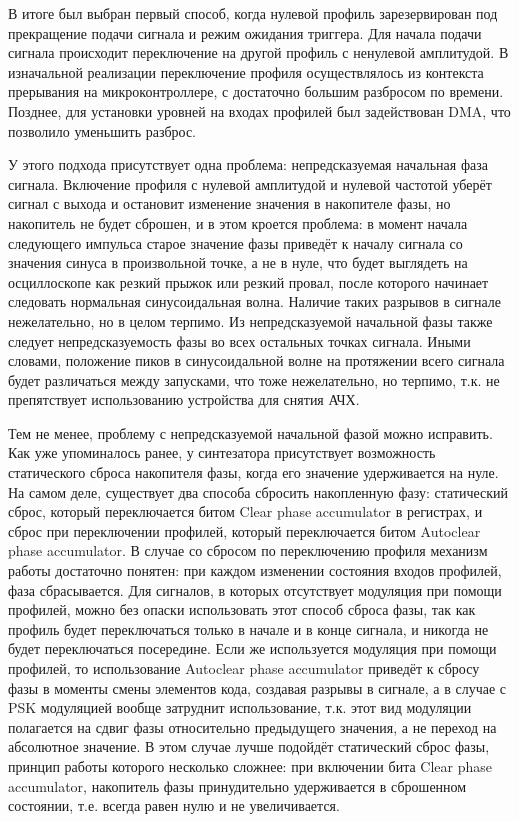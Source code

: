 \documentclass[rusmathsym, eqnumwithinsec, amspack, hyperref]{bomgost}
\begin{document}
В итоге был выбран первый способ, когда нулевой профиль зарезервирован под прекращение подачи сигнала и режим ожидания триггера. Для начала подачи сигнала происходит переключение на другой профиль с ненулевой амплитудой. В изначальной реализации переключение профиля осуществлялось из контекста прерывания на микроконтроллере, с достаточно большим разбросом по времени. Позднее, для установки уровней на входах профилей был задействован DMA, что позволило уменьшить разброс.

У этого подхода присутствует одна проблема: непредсказуемая начальная фаза сигнала. Включение профиля с нулевой амплитудой и нулевой частотой уберёт сигнал с выхода и остановит изменение значения в накопителе фазы, но накопитель не будет сброшен, и в этом кроется проблема: в момент начала следующего импульса старое значение фазы приведёт к началу сигнала со значения синуса в произвольной точке, а не в нуле, что будет выглядеть на осциллоскопе как резкий прыжок или резкий провал, после которого начинает следовать нормальная синусоидальная волна. Наличие таких разрывов в сигнале нежелательно, но в целом терпимо. Из непредсказуемой начальной фазы также следует непредсказуемость фазы во всех остальных точках сигнала. Иными словами, положение пиков в синусоидальной волне на протяжении всего сигнала будет различаться между запусками, что тоже нежелательно, но терпимо, т.к. не препятствует использованию устройства для снятия АЧХ.

Тем не менее, проблему с непредсказуемой начальной фазой можно исправить. Как уже упоминалось ранее, у синтезатора присутствует возможность статического сброса накопителя фазы, когда его значение удерживается на нуле. На самом деле, существует два способа сбросить накопленную фазу: статический сброс, который переключается битом \textenglish{Clear phase accumulator} в регистрах, и сброс при переключении профилей, который переключается битом Autoclear phase accumulator. В случае со сбросом по переключению профиля механизм работы достаточно понятен: при каждом изменении состояния входов профилей, фаза сбрасывается. Для сигналов, в которых отсутствует модуляция при помощи профилей, можно без опаски использовать этот способ сброса фазы, так как профиль будет переключаться только в начале и в конце сигнала, и никогда не будет переключаться посередине. Если же используется модуляция при помощи профилей, то использование Autoclear phase accumulator приведёт к сбросу фазы в моменты смены элементов кода, создавая разрывы в сигнале, а в случае с PSK модуляцией вообще затруднит использование, т.к. этот вид модуляции полагается на сдвиг фазы относительно предыдущего значения, а не переход на абсолютное значение. В этом случае лучше подойдёт статический сброс фазы, принцип работы которого несколько сложнее: при включении бита Clear phase accumulator, накопитель фазы принудительно удерживается в сброшенном состоянии, т.е. всегда равен нулю и не увеличивается.
\end{document}
